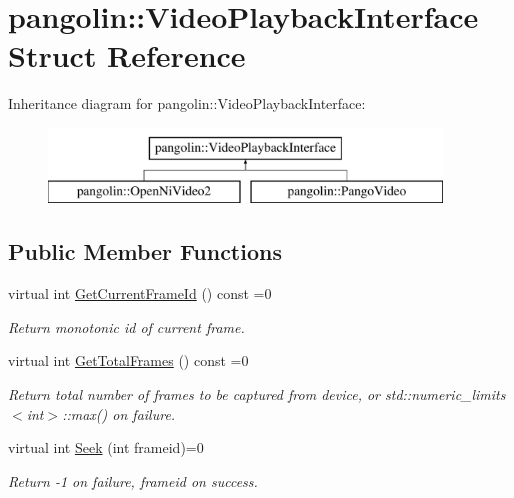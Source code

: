 \hypertarget{structpangolin_1_1_video_playback_interface}{}\section{pangolin\+:\+:Video\+Playback\+Interface Struct Reference}
\label{structpangolin_1_1_video_playback_interface}
Inheritance diagram for pangolin\+:\+:Video\+Playback\+Interface\+:\begin{figure}[H]
\begin{center}
\leavevmode
\includegraphics[height=2.000000cm]{structpangolin_1_1_video_playback_interface}
\end{center}
\end{figure}
\subsection*{Public Member Functions}
\begin{DoxyCompactItemize}
\item 
virtual int \hyperlink{structpangolin_1_1_video_playback_interface_a1853ad8ca4b10b8a87599d0c288b9c86}{Get\+Current\+Frame\+Id} () const =0\hypertarget{structpangolin_1_1_video_playback_interface_a1853ad8ca4b10b8a87599d0c288b9c86}{}\label{structpangolin_1_1_video_playback_interface_a1853ad8ca4b10b8a87599d0c288b9c86}

\begin{DoxyCompactList}\small\item\em Return monotonic id of current frame. \end{DoxyCompactList}\item 
virtual int \hyperlink{structpangolin_1_1_video_playback_interface_aa1ab605b49009c52a80eaa0cc074b63b}{Get\+Total\+Frames} () const =0
\begin{DoxyCompactList}\small\item\em Return total number of frames to be captured from device, or std\+::numeric\+\_\+limits$<$int$>$\+::max() on failure. \end{DoxyCompactList}\item 
virtual int \hyperlink{structpangolin_1_1_video_playback_interface_a0f65ae246e93ddc884b139ac0ba06d25}{Seek} (int frameid)=0\hypertarget{structpangolin_1_1_video_playback_interface_a0f65ae246e93ddc884b139ac0ba06d25}{}\label{structpangolin_1_1_video_playback_interface_a0f65ae246e93ddc884b139ac0ba06d25}

\begin{DoxyCompactList}\small\item\em Return -\/1 on failure, frameid on success. \end{DoxyCompactList}\end{DoxyCompactItemize}


